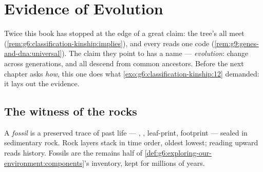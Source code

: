 \chapter{Evidence of Evolution}\label{ch:g9:evidence-of-evolution}

Twice this book has stopped at the edge of a great claim:
the  tree's  all meet
(\cref{rem:g6:classification-kinship:implies}), and every
 reads one code
(\cref{rem:g9:genes-and-dna:universal}). The claim they
point to has a name --- \emph{evolution}:  change
across generations, and all descend from common ancestors.
Before the next chapter asks \emph{how}, this one does what
\cref{exo:g6:classification-kinship:12} demanded: it lays
out the evidence.

\section{The witness of the rocks}

\begin{definition}[Fossils]\label{def:g9:evidence-of-evolution:fossils}
A \emph{fossil} is a preserved trace of past
life --- , , leaf-print, footprint --- sealed in
sedimentary rock. Rock layers stack in time order, oldest
lowest; reading upward reads history. Fossils are the
remains half of
\cref{def:g6:exploring-our-environment:components}'s
inventory, kept for millions of years.
\end{definition}

